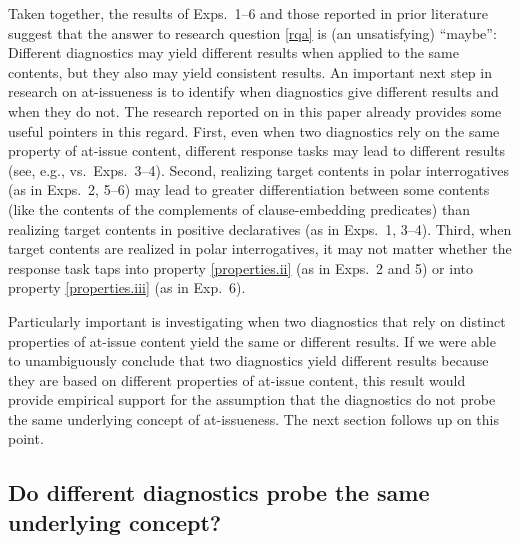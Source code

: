 \documentclass[times,linguex]{glossa}
\begin{document}
Taken together, the results of Exps.~1--6 and those reported in prior literature suggest that the answer to research question \ref{rqa} is (an unsatisfying) ``maybe'': Different diagnostics may yield different results when applied to the same contents, but they also may yield consistent results. An important next step in research on at-issueness is to identify when diagnostics give different results and when they do not. The research reported on in this paper already provides some useful pointers in this regard. First, even when two diagnostics rely on the same property of at-issue content, different response tasks may lead to different results (see, e.g., \citealt[Exp.~2]{syrett_experimental_2015} vs.~Exps.~3--4). Second, realizing target contents in polar interrogatives (as in Exps.~2, 5--6) may lead to greater differentiation between some contents (like the contents of the complements of clause-embedding predicates) than realizing target contents in positive declaratives (as in Exps.~1, 3--4). Third, when target contents are realized in polar interrogatives, it may not matter whether the response task taps into property \ref{properties.ii} (as in Exps.~2 and 5) or into property \ref{properties.iii} (as in Exp.~6).

Particularly important is investigating when two diagnostics that rely on distinct properties of at-issue content yield the same or different results. If we were able to unambiguously conclude that two diagnostics yield different results because they are based on different properties of at-issue content, this result would provide empirical support for the assumption that the diagnostics do not probe the same underlying concept of at-issueness. The next section follows up on this point.

\subsection{Do different diagnostics probe the same underlying concept?}\label{ssec:rqb}
\end{document}
